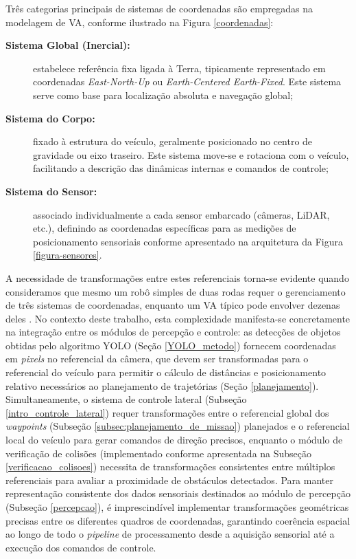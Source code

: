 Três categorias principais de sistemas de coordenadas são empregadas na modelagem de VA, conforme ilustrado na Figura \ref{coordenadas}:

\begin{description}
\item[\textbf{Sistema Global (Inercial):}] estabelece referência fixa ligada à Terra, tipicamente representado em coordenadas \textit{East-North-Up} ou \textit{Earth-Centered Earth-Fixed}. Este sistema serve como base para localização absoluta e navegação global;

\item[\textbf{Sistema do Corpo:}] fixado à estrutura do veículo, geralmente posicionado no centro de gravidade ou eixo traseiro. Este sistema move-se e rotaciona com o veículo, facilitando a descrição das dinâmicas internas e comandos de controle;

\item[\textbf{Sistema do Sensor:}] associado individualmente a cada sensor embarcado (câmeras, LiDAR, etc.), definindo as coordenadas específicas para as medições de posicionamento sensoriais conforme apresentado na arquitetura da Figura \ref{figura-sensores}.
\end{description}

A necessidade de transformações entre estes referenciais torna-se evidente quando consideramos que mesmo um robô simples de duas rodas requer o gerenciamento de três sistemas de coordenadas, enquanto um VA típico pode envolver dezenas deles \cite{University_of_Toronto2018-fe}. No contexto deste trabalho, esta complexidade manifesta-se concretamente na integração entre os módulos de percepção e controle: as detecções de objetos obtidas pelo algoritmo YOLO (Seção \ref{YOLO_metodo}) fornecem coordenadas em \textit{pixels} no referencial da câmera, que devem ser transformadas para o referencial do veículo para permitir o cálculo de distâncias e posicionamento relativo necessários ao planejamento de trajetórias (Seção \ref{planejamento}). Simultaneamente, o sistema de controle lateral (Subseção \ref{intro_controle_lateral}) requer transformações entre o referencial global dos \textit{waypoints} (Subseção \ref{subsec:planejamento_de_missao}) planejados e o referencial local do veículo para gerar comandos de direção precisos, enquanto o módulo de verificação de colisões (implementado conforme apresentada na Subseção \ref{verificacao_colisoes}) necessita de transformações consistentes entre múltiplos referenciais para avaliar a proximidade de obstáculos detectados. Para manter representação consistente dos dados sensoriais destinados ao módulo de percepção (Subseção \ref{percepcao}), é imprescindível implementar transformações geométricas precisas entre os diferentes quadros de coordenadas, garantindo coerência espacial ao longo de todo o \textit{pipeline} de processamento desde a aquisição sensorial até a execução dos comandos de controle.


